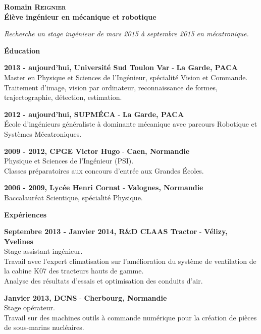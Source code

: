 \documentclass[a4paper,11pt,final]{memoir}
\newcommand{\Sep}{\vspace{1.5em}}
\newcommand{\SmallSep}{\vspace{0.5em}}
\newenvironment{AboutMe}
	{\ignorespaces}%
	{\SmallSep\ignorespacesafterend}
\newcommand{\CVSection}[1]
	{\Large\textbf{#1}\par
	\SmallSep\normalsize\normalfont}
\newcommand{\CVItem}[1]
	{\textbf{\color{RoyalBlue} #1}\normalsize\normalfont}
\newcommand{\city}[1]
	{{\small\textbf{#1}}\normalsize\normalfont}
\begin{document}
\Huge\bfseries {\color{RoyalBlue} Romain \textsc{Reignier}} \\
\Large\bfseries  Élève ingénieur en mécanique et robotique\\

\normalsize\normalfont

\begin{AboutMe}
\emph{Recherche un stage ingénieur de mars 2015 à septembre 2015 en mécatronique.}
\end{AboutMe}

\CVSection{Éducation}

\CVItem{2013 - aujourd'hui, Université Sud Toulon Var} - \city{La Garde, PACA}\\
Master en Physique et Sciences de l'Ingénieur, spécialité Vision et Commande.\\
Traitement d'image, vision par ordinateur, reconnaissance de formes, trajectographie, détection, estimation.
\SmallSep

\CVItem{2012 - aujourd'hui, SUPMÉCA} - \city{La Garde, PACA}\\
École d'ingénieurs généraliste à dominante mécanique avec parcours Robotique et Systèmes Mécatroniques.
\SmallSep

\CVItem{2009 - 2012, CPGE Victor Hugo} - \city{Caen, Normandie}\\
Physique et Sciences de l'Ingénieur (PSI).\\
Classes préparatoires aux concours d'entrée aux Grandes Écoles.
\SmallSep

\CVItem{2006 - 2009, Lycée Henri Cornat} - \city{Valognes, Normandie}\\
Baccalauréat Scientique, spécialité Physique.
\Sep

\CVSection{Expériences}

\CVItem{Septembre 2013 - Janvier 2014, R\&D CLAAS Tractor} - \city{Vélizy, Yvelines}\\
Stage assistant ingénieur.\\
Travail avec l'expert climatisation sur l'amélioration du système de ventilation de la cabine K07 des tracteurs hauts de gamme.\\
Analyse des résultats d'essais et optimisation des conduits d'air.
\SmallSep

\CVItem{Janvier 2013, DCNS} - \city{Cherbourg, Normandie}\\
Stage opérateur.\\
Travail sur des machines outils à commande numérique pour la création de pièces de sous-marins nucléaires.
\SmallSep
\end{document}
